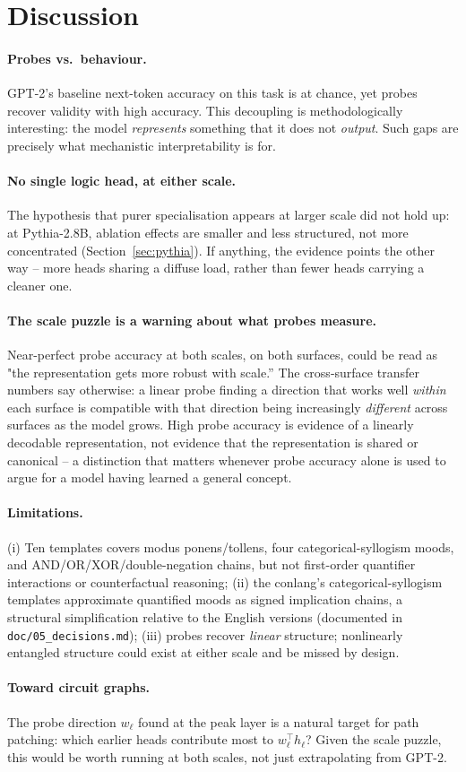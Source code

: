 \section{Discussion}

\paragraph{Probes vs.\ behaviour.} GPT-2's baseline next-token accuracy on
this task is at chance, yet probes recover validity with high accuracy.
This decoupling is methodologically interesting: the model \emph{represents}
something that it does not \emph{output}. Such gaps are precisely what
mechanistic interpretability is for.

\paragraph{No single logic head, at either scale.} The hypothesis that
purer specialisation appears at larger scale did not hold up: at
Pythia-2.8B, ablation effects are smaller and less structured, not more
concentrated (Section~\ref{sec:pythia}). If anything, the evidence points
the other way -- more heads sharing a diffuse load, rather than fewer
heads carrying a cleaner one.

\paragraph{The scale puzzle is a warning about what probes measure.}
Near-perfect probe accuracy at both scales, on both surfaces, could be
read as "the representation gets more robust with scale.'' The
cross-surface transfer numbers say otherwise: a linear probe finding a
direction that works well \emph{within} each surface is compatible with
that direction being increasingly \emph{different} across surfaces as the
model grows. High probe accuracy is evidence of a linearly decodable
representation, not evidence that the representation is shared or
canonical -- a distinction that matters whenever probe accuracy alone is
used to argue for a model having learned a general concept.

\paragraph{Limitations.} (i) Ten templates covers modus ponens/tollens,
four categorical-syllogism moods, and AND/OR/XOR/double-negation chains,
but not first-order quantifier interactions or counterfactual reasoning;
(ii) the conlang's categorical-syllogism templates approximate quantified
moods as signed implication chains, a structural simplification relative
to the English versions (documented in \texttt{doc/05\_decisions.md});
(iii) probes recover \emph{linear} structure; nonlinearly entangled
structure could exist at either scale and be missed by design.

\paragraph{Toward circuit graphs.} The probe direction $w_\ell$ found at
the peak layer is a natural target for path patching: which earlier heads
contribute most to $w_\ell^\top h_\ell$? Given the scale puzzle, this
would be worth running at both scales, not just extrapolating from GPT-2.
